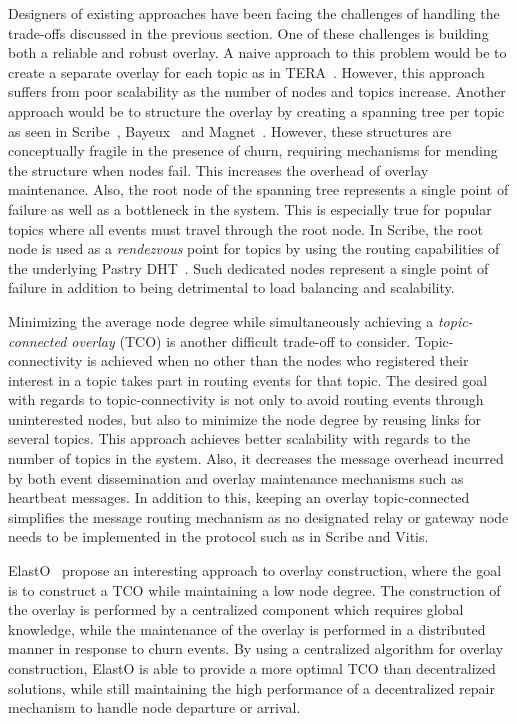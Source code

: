 Designers of existing approaches have been facing the challenges of
handling the trade-offs discussed in the previous section. One of these
challenges is building both a reliable and robust overlay. A naive
approach to this problem would be to create a separate overlay for each
topic as in TERA~\cite{Baldoni:2007}. However, this approach suffers from
poor scalability as the number of nodes and topics increase. Another
approach would be to structure the overlay by creating a spanning tree
per topic as seen in Scribe~\cite{Castro:2002}, Bayeux~\cite{Zhuang:2001}
and Magnet~\cite{Girdzijauskas:2010}. However, these structures are
conceptually fragile in the presence of churn, requiring mechanisms for
mending the structure when nodes fail. This increases the overhead of overlay
maintenance.  Also, the root node of the spanning tree represents a
single point of failure as well as a bottleneck in the system. This is
especially true for popular topics where all events must travel through
the root node. In Scribe, the root node is used as a \emph{rendezvous}
point for topics by using the routing capabilities of the underlying
Pastry DHT~\cite{Rowstron:2001}. Such dedicated nodes represent a
single point of failure in addition to being detrimental to load
balancing and scalability.

Minimizing the average node degree while simultaneously achieving a
\emph{topic-connected overlay} (TCO) is another difficult trade-off to
consider. Topic-connectivity is achieved when no other than the
nodes who registered their interest in a topic takes part in routing
events for that topic. The desired goal with regards to
topic-connectivity is not only to avoid routing events through
uninterested nodes, but also to minimize the node degree by reusing
links for several topics. This approach achieves better scalability with
regards to the number of topics in the system.  Also, it decreases the
message overhead incurred by both event dissemination and overlay
maintenance mechanisms such as heartbeat messages. In addition to this,
keeping an overlay topic-connected simplifies the message routing
mechanism as no designated relay or gateway node needs to be implemented
in the protocol such as in Scribe and Vitis.

ElastO~\cite{Chen:2013} propose an interesting approach to overlay
construction, where the goal is to construct a TCO while maintaining a low
node degree. The construction of the overlay is performed by a
centralized component which requires global knowledge, while the
maintenance of the overlay is performed in a distributed manner in
response to churn events. By using a centralized algorithm for overlay
construction, ElastO is able to provide a more optimal TCO than decentralized
solutions, while still maintaining the high performance of a
decentralized repair mechanism to handle node departure or arrival.

